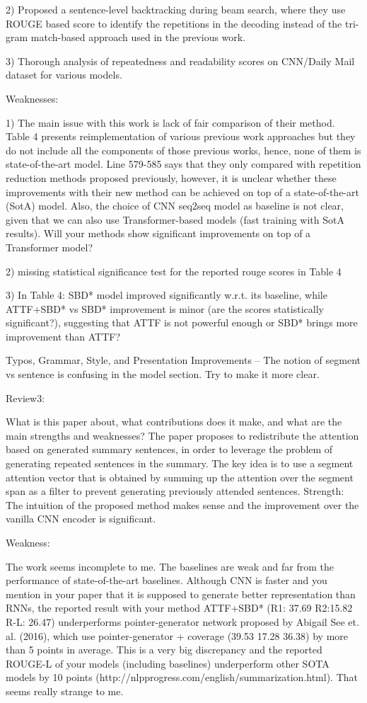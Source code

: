 2) Proposed a sentence-level backtracking during beam search, where they use ROUGE based score to identify the repetitions in the decoding instead of the tri-gram match-based approach used in the previous work.

3) Thorough analysis of repeatedness and readability scores on CNN/Daily Mail dataset for various models.

Weaknesses:

1) The main issue with this work is lack of fair comparison of their method. Table 4 presents reimplementation of various previous work approaches but they do not include all the components of those previous works, hence, none of them is state-of-the-art model. Line 579-585 says that they only compared with repetition reduction methods proposed previously, however, it is unclear whether these improvements with their new method can be achieved on top of a state-of-the-art (SotA) model. Also, the choice of CNN seq2seq model as baseline is not clear, given that we can also use Transformer-based models (fast training with SotA results). Will your methods show significant improvements on top of a Transformer model?

2) missing statistical significance test for the reported rouge scores in Table 4

3) In Table 4: SBD* model improved significantly w.r.t. its baseline, while ATTF+SBD* vs SBD* improvement is minor (are the scores statistically significant?), suggesting that ATTF is not powerful enough or SBD* brings more improvement than ATTF?

Typos, Grammar, Style, and Presentation Improvements
-- The notion of segment vs sentence is confusing in the model section. Try to make it more clear.

Review3:

What is this paper about, what contributions does it make, and what are the main strengths and weaknesses?
The paper proposes to redistribute the attention based on generated summary sentences, in order to leverage the problem of generating repeated sentences in the summary. The key idea is to use a segment attention vector that is obtained by summing up the attention over the segment span as a filter to prevent generating previously attended sentences.
Strength: The intuition of the proposed method makes sense and the improvement over the vanilla CNN encoder is significant.

Weakness:

The work seems incomplete to me. The baselines are weak and far from the performance of state-of-the-art baselines.
Although CNN is faster and you mention in your paper that it is supposed to generate better representation than RNNs, the reported result with your method ATTF+SBD* (R1: 37.69 R2:15.82 R-L: 26.47) underperforms pointer-generator network proposed by Abigail See et. al. (2016), which use pointer-generator + coverage (39.53 17.28 36.38) by more than 5 points in average. This is a very big discrepancy and the reported ROUGE-L of your models (including baselines) underperform other SOTA models by 10 points (http://nlpprogress.com/english/summarization.html). That seems really strange to me.

